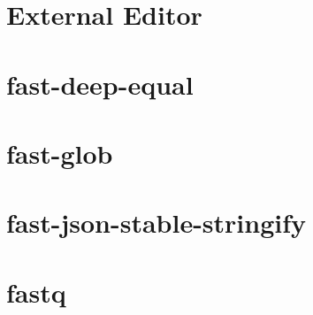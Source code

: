 \documentclass[twoside]{book}
\newcommand{\+}{\discretionary{\mbox{\scriptsize$\hookleftarrow$}}{}{}}
\begin{document}
\chapter{External Editor}
\label{md__c___users_vaishnavi_jadhav__desktop__developer_code_mean_stack_example_client_node_modules_external_editor__r_e_a_d_m_e}

\chapter{fast-\/deep-\/equal}
\label{md__c___users_vaishnavi_jadhav__desktop__developer_code_mean_stack_example_client_node_modules_fast_deep_equal__r_e_a_d_m_e}

\chapter{fast-\/glob}
\label{md__c___users_vaishnavi_jadhav__desktop__developer_code_mean_stack_example_client_node_modules_fast_glob__r_e_a_d_m_e}

\chapter{fast-\/json-\/stable-\/stringify}
\label{md__c___users_vaishnavi_jadhav__desktop__developer_code_mean_stack_example_client_node_modules_f888089189c6d962e562fa0388f99b704}

\chapter{fastq}
\label{md__c___users_vaishnavi_jadhav__desktop__developer_code_mean_stack_example_client_node_modules_fastq__r_e_a_d_m_e}

\end{document}
